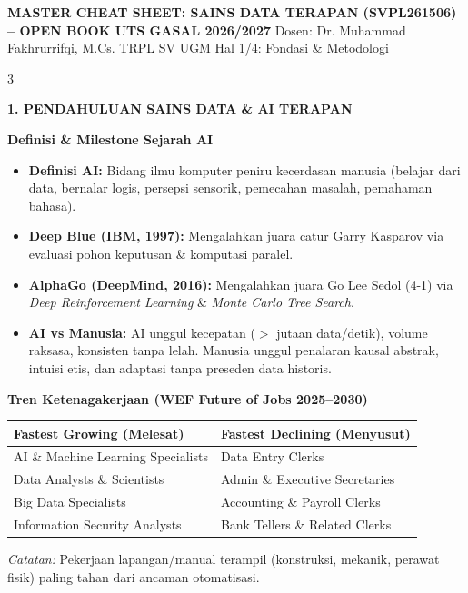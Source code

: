 \documentclass[6.8pt,landscape,a4paper]{extarticle}
\newcommand{\sdtSection}[2][sdtNavy]{%
    \vspace{0.6pt}%
    \noindent\colorbox{#1}{%
        \parbox{\dimexpr\linewidth-2\fboxsep\relax}{%
            \textbf{\fontsize{6.5pt}{7.5pt}\selectfont\color{white}#2}%
        }%
    }\vspace{0.3pt}%
}
\newcommand{\sdtSub}[1]{%
    \vspace{0.5pt}%
    \noindent\textbf{\fontsize{5.8pt}{6.8pt}\selectfont\color{sdtBlue}#1}\vspace{0.1pt}%
}
\begin{document}
\noindent\colorbox{sdtNavy}{%
    \parbox{\dimexpr\textwidth-2\fboxsep\relax}{%
        \color{white}%
        \textbf{\fontsize{7.8pt}{8.8pt}\selectfont MASTER CHEAT SHEET: SAINS DATA TERAPAN (SVPL261506) -- OPEN BOOK UTS GASAL 2026/2027}%
        \hfill%
        \fontsize{5.8pt}{6.8pt}\selectfont Dosen: Dr. Muhammad Fakhrurrifqi, M.Cs. \textbar{} TRPL SV UGM \textbar{} Hal 1/4: Fondasi \& Metodologi%
    }%
}
\vspace{0.2mm}

\begin{multicols}{3}

\sdtSection{1. PENDAHULUAN SAINS DATA \& AI TERAPAN}

\sdtSub{Definisi \& Milestone Sejarah AI}
\begin{itemize}
    \item \textbf{Definisi AI:} Bidang ilmu komputer peniru kecerdasan manusia (belajar dari data, bernalar logis, persepsi sensorik, pemecahan masalah, pemahaman bahasa).
    \item \textbf{Deep Blue (IBM, 1997):} Mengalahkan juara catur Garry Kasparov via evaluasi pohon keputusan \& komputasi paralel.
    \item \textbf{AlphaGo (DeepMind, 2016):} Mengalahkan juara Go Lee Sedol (4-1) via \textit{Deep Reinforcement Learning} \& \textit{Monte Carlo Tree Search}.
    \item \textbf{AI vs Manusia:} AI unggul kecepatan ($>$ jutaan data/detik), volume raksasa, konsisten tanpa lelah. Manusia unggul penalaran kausal abstrak, intuisi etis, dan adaptasi tanpa preseden data historis.
\end{itemize}

\sdtSub{Tren Ketenagakerjaan (WEF Future of Jobs 2025--2030)}
\begin{center}
{\fontsize{5pt}{6pt}\selectfont
\begin{tabular}{@{}ll@{}}
\toprule
\textbf{Fastest Growing (Melesat)} & \textbf{Fastest Declining (Menyusut)} \\
\midrule
AI \& Machine Learning Specialists & Data Entry Clerks \\
Data Analysts \& Scientists & Admin \& Executive Secretaries \\
Big Data Specialists & Accounting \& Payroll Clerks \\
Information Security Analysts & Bank Tellers \& Related Clerks \\
\bottomrule
\end{tabular}}
\end{center}
\textit{Catatan:} Pekerjaan lapangan/manual terampil (konstruksi, mekanik, perawat fisik) paling tahan dari ancaman otomatisasi.


\end{multicols}
\end{document}

